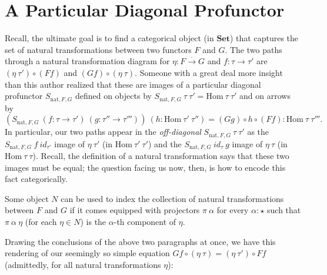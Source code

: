 \documentclass[letterpaper]{article}
\begin{document}
\section{A Particular Diagonal Profunctor}
\label{sec:apdp}

Recall, the ultimate goal is to find a categorical object (in
$\mathbf{Set}$) that captures the set of natural transformations between two
functors $F$ and $G$.  The two paths through a natural transformation
diagram for $\eta : F \stackrel{\cdot}{\to} G$ and $f : \tau \to \tau'$ are
$(\eta~\tau') \circ (F f)$ and $(G f) \circ (\eta~\tau)$.  Someone with a
great deal more insight than this author realized that these are images of a
particular diagonal profunctor $S_{\text{nat},F,G}$ defined on objects by
$S_{\text{nat},F,G}~\tau~\tau' = \text{Hom}~\tau~\tau'$ and on arrows by
%
\[ (S_{\text{nat},F,G}~(f : \tau \to \tau')~(g : \tau'' \to \tau'''))~(h :
\text{Hom}~\tau'~\tau'') = (G g) \circ h \circ (F f) :
\text{Hom}~\tau~\tau'''.\]
%
In particular, our two paths appear in the {\em off-diagonal}
$S_{\text{nat},F,G}~\tau~\tau'$ as the $S_{\text{nat},F,G}~f~id_{\tau'}$
image of $\eta~\tau'$ (in $\text{Hom}~\tau'~\tau'$) and the
$S_{\text{nat},F,G}~id_{\tau}~g$ image of $\eta~\tau$ (in
$\text{Hom}~\tau~\tau$).  Recall, the definition of a natural transformation
says that these two images must be equal; the question facing us now, then,
is how to encode this fact categorically.

Some object $N$ can be used to index the collection of natural
transformations between $F$ and $G$ if it comes equipped with projectors
$\pi~\alpha$ for every $\alpha : \star$ such that $\pi~\alpha~\eta$ (for
each $\eta \in N$) is the $\alpha$-th component of $\eta$.

Drawing the conclusions of the above two paragraphs at once, we have this
rendering of our seemingly so simple equation $G f \circ (\eta~\tau) =
(\eta~\tau') \circ F f$ (admittedly, for all natural transformations
$\eta$):
%
\begin{center}\end{center}
\end{document}
